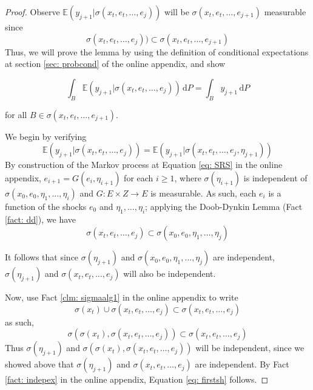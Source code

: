 \documentclass[12pt]{ectaart}
\newcommand{\1}{\mathbbm 1}
\theoremstyle{plain}
\theoremstyle{definition}
\begin{document}
	\begin{proof}
	
	Observe  $\mathbb{E}(y_{j+1}\vert \sigma(x_{t},e_{t},\dots,e_{j}))$ will be $\sigma(x_{t},e_{t},\dots,e_{j+1})$ measurable since $$\sigma(x_{t},e_{t},\dots,e_{j}))\subset\sigma(x_{t},e_{t},\dots,e_{j+1})$$ Thus, we will prove the lemma by using the definition of conditional expectations at section \ref{sec: probcond} of the  online appendix, and show
	
	\begin{equation}\label{eq: conddef}
	\int_{B} \mathbb{E}(y_{j+1}\vert \sigma(x_{t},e_{t},\dots,e_{j}))\, \mathrm{d}P = \int_{B} y_{j+1}\,\mathrm{d}P
	\end{equation}
	
	for all $B\in \sigma(x_{t},e_{t},\dots,e_{j+1})$. 
	
	We begin by verifying 
	\begin{equation}\label{eq: firstsh}
	\mathbb{E}(y_{j+1}\vert \sigma(x_{t},e_{t},\dots,e_{j})) = \mathbb{E}(y_{j+1}\vert \sigma(x_{t},e_{t},\dots,e_{j},\eta_{j+1}))
	\end{equation}
	By construction of the Markov process at Equation \eqref{eq: SRS} in the online appendix, $e_{i+1} = G(e_{i},\eta_{i+1})$ for each $i\geq 1$, where $\sigma(\eta_{i+1})$ is independent of $\sigma(x_{0},e_{0},\eta_{1},\dots,\eta_{i})$ and $G\colon E\times Z \rightarrow E$ is measurable. As such, each $e_{i}$ is a function  of the shocks $e_{0}$ and $\eta_{1},\dots, \eta_{i}$; applying the Doob-Dynkin Lemma (Fact \ref{fact: dd}), we have
	\begin{equation*}
	\sigma(x_{t},e_{t},\dots,e_{j})\subset  \sigma(x_{0},e_{0},\eta_{1},\dots,\eta_{j})
	\end{equation*}
	
	It follows that since $\sigma(\eta_{j+1})$ and $\sigma(x_{0},e_{0},\eta_{1},\dots,\eta_{j})$ are independent, $\sigma(\eta_{j+1})$ and $\sigma(x_{t},e_{t},\dots,e_{j})$ will also be independent. 
	
	Now, use Fact \ref{clm: sigmaalg1} in the online appendix to write $$\sigma(x_{t})\cup\sigma(x_{t},e_{t},\dots,e_{j})\subset \sigma(x_{t},e_{t},\dots,e_{j})$$as such, 
	\begin{equation*}
	\sigma(\sigma(x_{t}),\sigma(x_{t},e_{t},\dots,e_{j}))\subset \sigma(x_{t},e_{t},\dots,e_{j})
	\end{equation*}
	Thus $\sigma(\eta_{j+1})$ and $\sigma(\sigma(x_{t}),\sigma(x_{t},e_{t},\dots,e_{j}))$ will be independent, since we showed above that $\sigma(\eta_{j+1})$ and $\sigma(x_{t},e_{t},\dots,e_{j})$ are independent. By Fact \ref{fact: indepex} in the online appendix, Equation \eqref{eq: firstsh} follows.
	

\end{proof}
\end{document}
